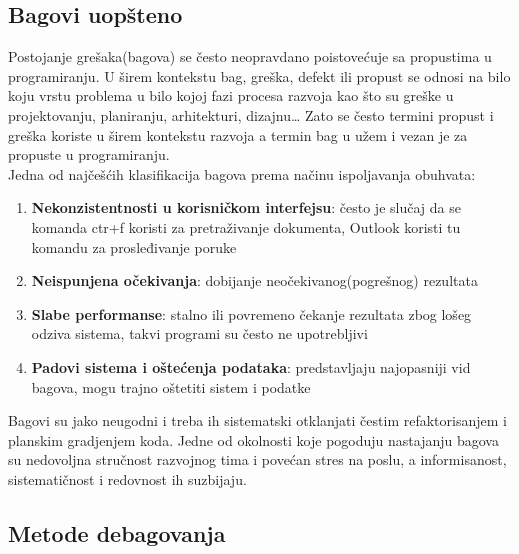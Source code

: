 \documentclass[a4paper]{article}
\begin{document}
\subsection{Bagovi uopšteno}
\label{subsec:podnaslov1}

Postojanje grešaka(bagova) se često neopravdano poistovećuje sa propustima u programiranju.
U širem kontekstu bag, greška, defekt ili propust se odnosi na bilo koju vrstu problema u bilo kojoj fazi procesa razvoja kao što su greške u projektovanju, planiranju, arhitekturi, dizajnu…
Zato se često termini propust i greška koriste u širem kontekstu razvoja a termin bag u užem i vezan je za propuste u programiranju.\\
\indent Jedna od najčešćih klasifikacija bagova prema načinu ispoljavanja obuhvata:
\begin{enumerate}
	\item \textbf{Nekonzistentnosti u korisničkom interfejsu}: često je slučaj da se komanda ctr+f koristi za pretraživanje dokumenta, Outlook koristi   
	tu komandu za prosleđivanje poruke
	\item \textbf{Neispunjena očekivanja}: dobijanje neočekivanog(pogrešnog) rezultata
	\item \textbf{Slabe performanse}: stalno ili povremeno čekanje rezultata zbog lošeg odziva sistema, takvi programi su često ne upotrebljivi
	\item \textbf{Padovi sistema i oštećenja podataka}: predstavljaju najopasniji vid bagova, mogu trajno oštetiti sistem i podatke
\end{enumerate}
\indent Bagovi su jako neugodni i treba ih sistematski otklanjati čestim refaktorisanjem i planskim gradjenjem koda. Jedne od okolnosti koje pogoduju nastajanju bagova su nedovoljna stručnost razvojnog tima i povećan stres na poslu, a informisanost, sistematičnost i redovnost ih suzbijaju. \cite{bagovi_smalkov}


\subsection{Metode debagovanja}
\label{subsec:podnaslov2}
\end{document}

